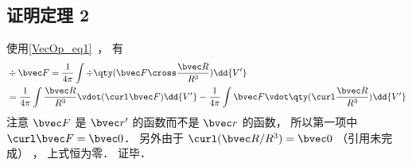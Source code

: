 \subsection{证明定理 2}
使用\autoref{VecOp_eq1}~， 有
\begin{equation}
\begin{aligned}
&\div \bvec F = \frac{1}{4\pi} \int \div \qty(\bvec F \cross \frac{\bvec R}{R^3}) \dd{V'}\\
&= \frac{1}{4\pi} \int \frac{\bvec R}{R^3} \vdot (\curl \bvec F)\dd{V'} - \frac{1}{4\pi} \int \bvec F \vdot \qty(\curl \frac{\bvec R}{R^3})\dd{V'}
\end{aligned}
\end{equation}
注意 $\bvec F$ 是 $\bvec r'$ 的函数而不是 $\bvec r$ 的函数， 所以第一项中 $\curl \bvec F = \bvec 0$． 另外由于 $\curl(\bvec R/R^3) = \bvec 0$ （引用未完成） ， 上式恒为零． 证毕．
